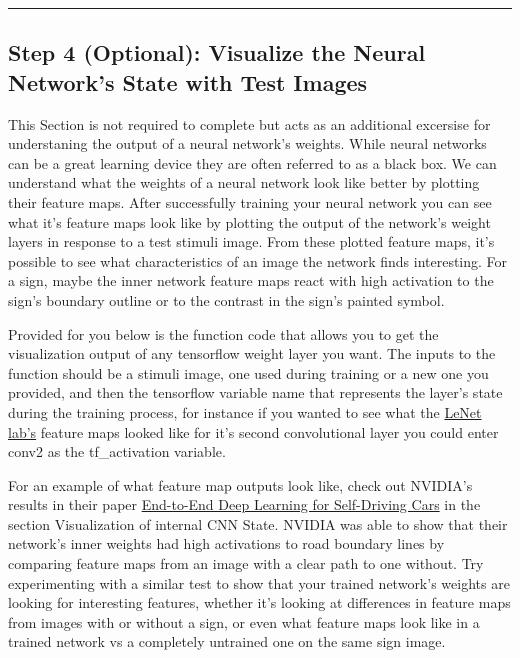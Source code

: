 \documentclass[11pt]{article}
\begin{document}
    \begin{center}\rule{0.5\linewidth}{\linethickness}\end{center}

\hypertarget{step-4-optional-visualize-the-neural-networks-state-with-test-images}{%
\subsection{Step 4 (Optional): Visualize the Neural Network's State with
Test
Images}\label{step-4-optional-visualize-the-neural-networks-state-with-test-images}}

This Section is not required to complete but acts as an additional
excersise for understaning the output of a neural network's weights.
While neural networks can be a great learning device they are often
referred to as a black box. We can understand what the weights of a
neural network look like better by plotting their feature maps. After
successfully training your neural network you can see what it's feature
maps look like by plotting the output of the network's weight layers in
response to a test stimuli image. From these plotted feature maps, it's
possible to see what characteristics of an image the network finds
interesting. For a sign, maybe the inner network feature maps react with
high activation to the sign's boundary outline or to the contrast in the
sign's painted symbol.

Provided for you below is the function code that allows you to get the
visualization output of any tensorflow weight layer you want. The inputs
to the function should be a stimuli image, one used during training or a
new one you provided, and then the tensorflow variable name that
represents the layer's state during the training process, for instance
if you wanted to see what the
\href{https://classroom.udacity.com/nanodegrees/nd013/parts/fbf77062-5703-404e-b60c-95b78b2f3f9e/modules/6df7ae49-c61c-4bb2-a23e-6527e69209ec/lessons/601ae704-1035-4287-8b11-e2c2716217ad/concepts/d4aca031-508f-4e0b-b493-e7b706120f81}{LeNet
lab's} feature maps looked like for it's second convolutional layer you
could enter conv2 as the tf\_activation variable.

For an example of what feature map outputs look like, check out NVIDIA's
results in their paper
\href{https://devblogs.nvidia.com/parallelforall/deep-learning-self-driving-cars/}{End-to-End
Deep Learning for Self-Driving Cars} in the section Visualization of
internal CNN State. NVIDIA was able to show that their network's inner
weights had high activations to road boundary lines by comparing feature
maps from an image with a clear path to one without. Try experimenting
with a similar test to show that your trained network's weights are
looking for interesting features, whether it's looking at differences in
feature maps from images with or without a sign, or even what feature
maps look like in a trained network vs a completely untrained one on the
same sign image.
\end{document}
